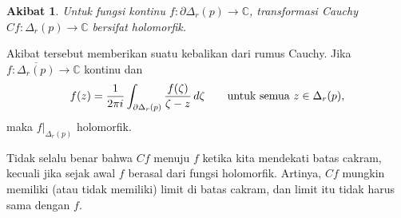 \documentclass[12pt,openany]{book}
\newcommand{\avoidbreak}{\postdisplaypenalty=100}
\newcommand{\C}{{\mathbb{C}}}
\theoremstyle{plain}
\newtheorem{cor}[thm]{Akibat}
\theoremstyle{remark}
\theoremstyle{definition}
\theoremstyle{exercise}
\theoremstyle{example}
\begin{document}
\begin{cor}
Untuk fungsi kontinu $f \colon \partial \Delta_r(p) \to \C$,
transformasi Cauchy $Cf \colon \Delta_r(p) \to \C$ bersifat holomorfik.
\end{cor}

Akibat tersebut memberikan suatu kebalikan dari rumus Cauchy.
Jika $f \colon \overline{\Delta_r(p)} \to \C$ kontinu dan
\begin{equation*}
f(z) =
\frac{1}{2\pi i}
\int_{\partial \Delta_r(p)} \frac{f(\zeta)}{\zeta-z} \, d\zeta
\qquad \text{untuk semua } z \in \Delta_r(p),
\avoidbreak
\end{equation*}
maka $f|_{\Delta_r(p)}$ holomorfik.

Tidak selalu benar bahwa $Cf$ menuju $f$ ketika kita mendekati
batas cakram, kecuali jika sejak awal $f$ berasal dari 
fungsi holomorfik.  Artinya, $Cf$ mungkin memiliki (atau tidak memiliki) limit di
batas cakram, dan limit itu tidak harus sama dengan $f$.
\end{document}
